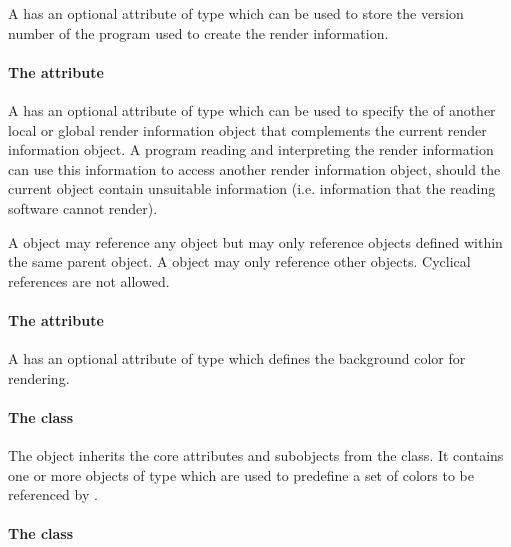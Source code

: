 A \RenderInformationBase has an optional attribute
 of type  which can be used to store 
the version number of the program used to create the render information.

\paragraph{The \fixttspace{} attribute}

A \RenderInformationBase has an optional attribute
 of type  which can be used to 
specify the  of another local or global render information object 
that complements the current render information object. A program reading and 
interpreting the render information can use this information to access another 
render information object, should the current object contain unsuitable information (i.e. information that the reading software cannot render). 

A \LocalRenderInformation object may reference any 
\GlobalRenderInformation object but may only reference \LocalRenderInformation objects defined within the same parent  object. 
A \GlobalRenderInformation object may only reference other \GlobalRenderInformation objects. Cyclical references are not allowed.


\paragraph{The \fixttspace{} attribute}

A \RenderInformationBase has an optional attribute
 of type  which defines the background 
color for rendering.

\paragraph{The  class}
\label{listofcolordefinitions-class}

The \ListOfColorDefinitions object
inherits the core attributes and subobjects from the 
class. It contains one or more objects of type \ColorDefinition which are used to predefine a set of colors to be referenced by \Styles. 

\paragraph{The  class}
\label{listofgradientdefinitions-class}

